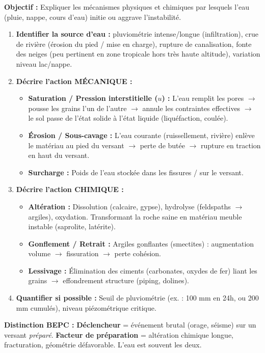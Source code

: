 \documentclass[11pt]{article}
\begin{document}
\begin{methode}
    \textbf{Objectif :} Expliquer les mécanismes physiques et chimiques par lesquels l'eau (pluie, nappe, cours d'eau) initie ou aggrave l'instabilité.
    \begin{enumerate}
        \item \textbf{Identifier la source d'eau :} pluviométrie intense/longue (infiltration), crue de rivière (érosion du pied / mise en charge), rupture de canalisation, fonte des neiges (peu pertinent en zone tropicale hors très haute altitude), variation niveau lac/nappe.
        \item \textbf{Décrire l'action \textbf{MÉCANIQUE} :}
            \begin{itemize}
                \item \textbf{Saturation / Pression interstitielle ($u$) :} L'eau remplit les pores $\rightarrow$ pousse les grains l'un de l'autre $\rightarrow$ annule les contraintes effectives $\rightarrow$ le sol passe de l'état solide à l'état liquide (liquéfaction, coulée).
                \item \textbf{Érosion / Sous-cavage :} L'eau courante (ruissellement, rivière) enlève le matériau au pied du versant $\rightarrow$ perte de butée $\rightarrow$ rupture en traction en haut du versant.
                \item \textbf{Surcharge :} Poids de l'eau stockée dans les fissures / sur le versant.
            \end{itemize}
        \item \textbf{Décrire l'action \textbf{CHIMIQUE} :}
            \begin{itemize}
                \item \textbf{Altération :} Dissolution (calcaire, gypse), hydrolyse (feldspaths $\rightarrow$ argiles), oxydation. Transformant la roche saine en matériau meuble instable (saprolite, latérite).
                \item \textbf{Gonflement / Retrait :} Argiles gonflantes (smectites) : augmentation volume $\rightarrow$ fissuration $\rightarrow$ perte cohésion.
                \item \textbf{Lessivage :} Élimination des ciments (carbonates, oxydes de fer) liant les grains $\rightarrow$ effondrement structure (piping, dolines).
            \end{itemize}
        \item \textbf{Quantifier si possible :} Seuil de pluviométrie (ex. : 100 mm en 24h, ou 200 mm cumulés), niveau piézométrique critique.
    \end{enumerate}
    \textbf{Distinction BEPC :} \textbf{Déclencheur} = événement brutal (orage, séisme) sur un versant \emph{préparé}. \textbf{Facteur de préparation} = altération chimique longue, fracturation, géométrie défavorable. L'eau est souvent les deux.
\end{methode}
\end{document}
